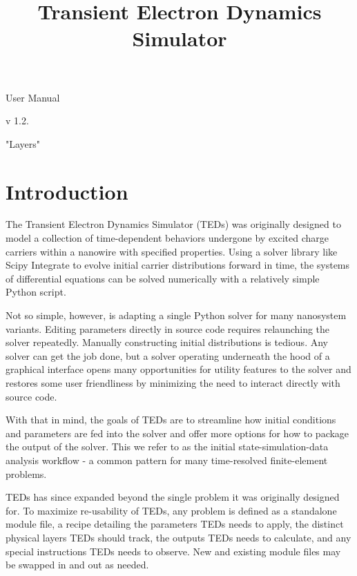 \documentclass[11pt,letterpaper,titlepage]{article}
\title{Transient Electron Dynamics Simulator}
\begin{document}
	\begin{titlepage}
		\begin{center}
			\makeatletter
			{\huge \@title}
			\begin{large}
				\par User Manual
				\par v 1.2.
				\par "Layers"
			\end{large}
		\end{center}
		\makeatother
	\end{titlepage}
	
	\tableofcontents
	\newpage
	\section{Introduction}
		\par
		The Transient Electron Dynamics Simulator (TEDs) was originally designed to model a collection of time-dependent behaviors undergone by excited charge carriers within a nanowire with specified properties. Using a solver library like Scipy Integrate to evolve initial carrier distributions forward in time, the systems of differential equations can be solved numerically with a relatively simple Python script.
		
		\par
		Not so simple, however, is adapting a single Python solver for many nanosystem variants. Editing parameters directly in source code requires relaunching the solver repeatedly. Manually constructing initial distributions is tedious. Any solver can get the job done, but a solver operating underneath the hood of a graphical interface opens many opportunities for utility features to the solver and restores some user friendliness by minimizing the need to interact directly with source code.
		
		\par
		With that in mind, the goals of TEDs are to streamline how initial conditions and parameters are fed into the solver and offer more options for how to package the output of the solver. This we refer to as the initial state-simulation-data analysis workflow - a common pattern for many time-resolved finite-element problems.
		
		\par
		TEDs has since expanded beyond the single problem it was originally designed for. To maximize re-usability of TEDs, any problem is defined as a standalone module file, a recipe detailing the parameters TEDs needs to apply, the distinct physical layers TEDs should track, the outputs TEDs needs to calculate, and any special instructions TEDs needs to observe. New and existing module files may be swapped in and out as needed.
		
\end{document}
